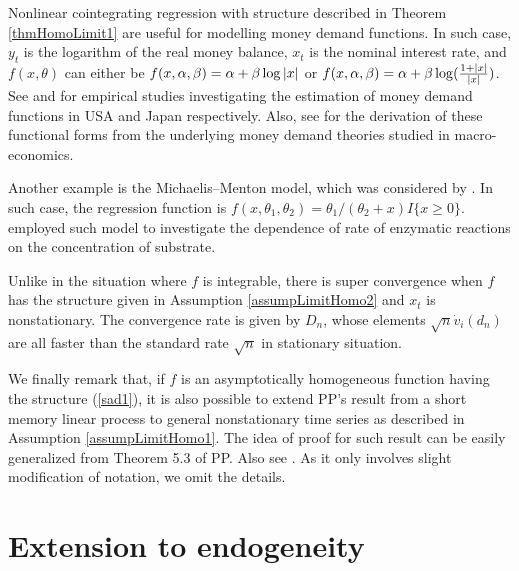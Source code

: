 \begin{rem}
Nonlinear cointegrating regression with structure described in Theorem \ref{thmHomoLimit1} are useful for modelling money demand functions. In such case, $y_t$ is the logarithm of the real money balance, $x_t$ is the nominal interest rate, and $f(x, \theta)$ can either be $f(x, \alpha, \beta) = \alpha + \beta \log | x |$ or $f(x, \alpha, \beta) = \alpha + \beta \log (\frac{1 + |x|}{|x|})$. See \cite{baedejong2007} and \cite{baekakkarogaki2006} for empirical studies investigating the estimation of money demand functions in USA and Japan respectively. Also, see \cite{baekakkarogaki2004} for the derivation of these functional forms from the underlying money demand theories studied in macro-economics.
\end{rem}

\begin{rem}
Another example is the Michaelis--Menton model, which was considered by \cite{lai1994}. In such case, the regression function is $f(x, \theta_1, \theta_2) = \theta_1 / (\theta_2 + x) I \{ x \ge 0 \}$. \cite{bateswatts1988} employed such model to investigate the dependence of rate of enzymatic reactions on the concentration of substrate.
\end{rem}

\begin{rem}
Unlike in the situation where $f$ is integrable, there is super convergence when $f$ has the structure given in Assumption \ref{assumpLimitHomo2} and  $x_t$ is nonstationary. The convergence rate is given by $D_n$, whose elements $\sqrt{n} \dot{v}_i(d_n)$ are all faster than the standard rate $\sqrt{n}$ in stationary situation.
\end{rem}

We finally remark that, if  $f$ is an asymptotically homogeneous function
having the structure (\ref {sad1}), it is also possible to extend PP's result from a short memory  linear process to  general nonstationary time series as described  in Assumption \ref{assumpLimitHomo1}. The idea of proof for such result can be easily generalized from Theorem 5.3 of PP. Also see \cite{changparkphillips2001}.  As it only involves slight modification of notation, we omit the details.


\section{Extension to endogeneity } 

